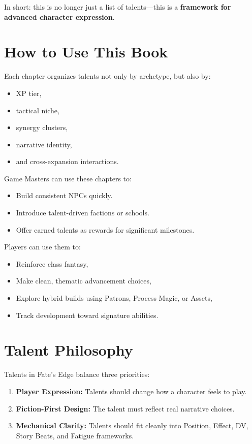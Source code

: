 \documentclass[11pt]{book}
\begin{document}
In short: this is no longer just a list of talents---this is a \textbf{framework for advanced
character expression}.

\section{How to Use This Book}

Each chapter organizes talents not only by archetype, but also by:
\begin{itemize}
    \item XP tier,
    \item tactical niche,
    \item synergy clusters,
    \item narrative identity,
    \item and cross-expansion interactions.
\end{itemize}

Game Masters can use these chapters to:
\begin{itemize}
    \item Build consistent NPCs quickly.
    \item Introduce talent-driven factions or schools.
    \item Offer earned talents as rewards for significant milestones.
\end{itemize}

Players can use them to:
\begin{itemize}
    \item Reinforce class fantasy,
    \item Make clean, thematic advancement choices,
    \item Explore hybrid builds using Patrons, Process Magic, or Assets,
    \item Track development toward signature abilities.
\end{itemize}

\section{Talent Philosophy}

Talents in Fate's Edge balance three priorities:
\begin{enumerate}
    \item \textbf{Player Expression:} Talents should change how a character feels to play.
    \item \textbf{Fiction-First Design:} The talent must reflect real narrative choices.
    \item \textbf{Mechanical Clarity:} Talents should fit cleanly into Position, Effect, DV,
          Story Beats, and Fatigue frameworks.
\end{enumerate}
\end{document}
